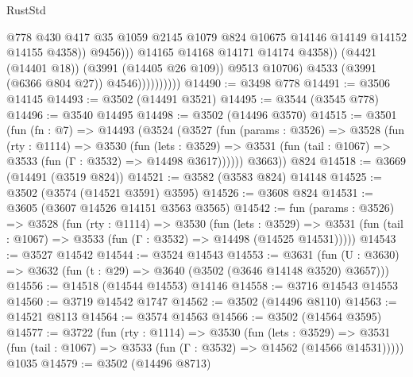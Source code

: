 \begin{lexlean}{RustStd}
\begin{coremodule}
                                        @778
                                        @430
                                        @417
                                        @35
                                        @1059
                                        @2145
                                        @1079
                                        @824
                                        @10675
                                        @14146
                                        @14149
                                        @14152
                                        @14155
                                        @4358))
                                    @9456)))
                              @14165
                              @14168
                              @14171
                              @14174
                              @4358))
                          (@4421 (@14401 @18))
                          (@3991 (@14405 @26 @109))
                          @9513
                          @10706)
                        @4533
                        (@3991 (@6366 @804 @27))
                        @4546))))))))))
@14490 := @3498 @778
@14491 := @3506 @14145
@14493 := @3502 (@14491 @3521)
@14495 := @3544 (@3545 @778)
@14496 := @3540 @14495
@14498 := @3502 (@14496 @3570)
@14515 := @3501
    (fun (fn : @7) =>
    @14493
      (@3524
        (@3527
          (fun (params : @3526) =>
          @3528
            (fun (rty : @1114) =>
            @3530
              (fun (lets : @3529) =>
              @3531 (fun (tail : @1067) => @3533 (fun (Γ : @3532) => @14498 @3617))))))
        @3663))
    @824
@14518 := @3669 (@14491 (@3519 @824))
@14521 := @3582 (@3583 @824) @14148
@14525 := @3502 (@3574 (@14521 @3591) @3595)
@14526 := @3608 @824
@14531 := @3605 (@3607 @14526 @14151 @3563 @3565)
@14542 := fun (params : @3526) =>
  @3528
    (fun (rty : @1114) =>
    @3530
      (fun (lets : @3529) =>
      @3531 (fun (tail : @1067) => @3533 (fun (Γ : @3532) => @14498 (@14525 @14531)))))
@14543 := @3527 @14542
@14544 := @3524 @14543
@14553 := @3631
    (fun (U : @3630) => @3632 (fun (t : @29) => @3640 (@3502 (@3646 @14148 @3520) @3657)))
@14556 := @14518 (@14544 @14553) @14146
@14558 := @3716 @14543 @14553
@14560 := @3719 @14542 @1747
@14562 := @3502 (@14496 @8110)
@14563 := @14521 @8113
@14564 := @3574 @14563
@14566 := @3502 (@14564 @3595)
@14577 := @3722
    (fun (rty : @1114) =>
    @3530
      (fun (lets : @3529) =>
      @3531 (fun (tail : @1067) => @3533 (fun (Γ : @3532) => @14562 (@14566 @14531)))))
    @1035
@14579 := @3502 (@14496 @8713)

\end{coremodule}
\end{lexlean}
